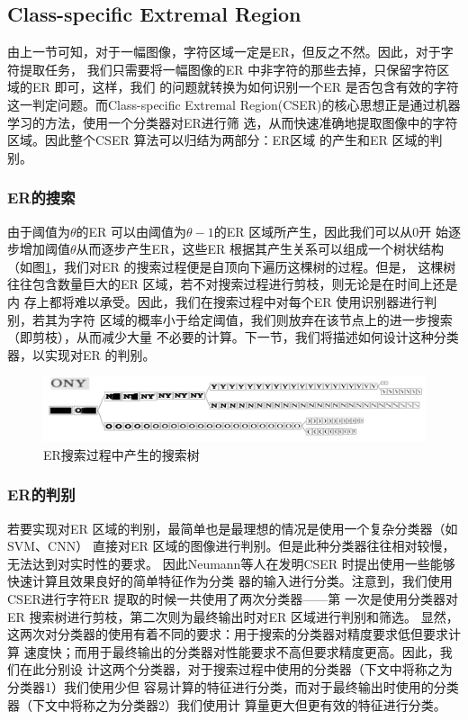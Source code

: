 \subsection{Class-specific Extremal Region}

由上一节可知，对于一幅图像，字符区域一定是ER，但反之不然。因此，对于字符提取任务，
我们只需要将一幅图像的ER 中非字符的那些去掉，只保留字符区域的ER 即可，这样，我们
的问题就转换为如何识别一个ER 是否包含有效的字符这一判定问题。而Class-specific
Extremal Region(CSER)\cite{Neumann:2012ik}的核心思想正是通过机器学习的方法，使用一个分类器对ER进行筛
选，从而快速准确地提取图像中的字符区域。因此整个CSER 算法可以归结为两部分：ER区域
的产生和ER 区域的判别。

\subsubsection{ER的搜索}

由于阈值为$\theta$的ER 可以由阈值为$\theta-1$的ER 区域所产生，因此我们可以从0开
始逐步增加阈值$\theta$从而逐步产生ER，这些ER 根据其产生关系可以组成一个树状结构
（如图\ref{Fig:ERTree}，我们对ER 的搜索过程便是自顶向下遍历这棵树的过程。但是，
这棵树往往包含数量巨大的ER 区域，若不对搜索过程进行剪枝，则无论是在时间上还是内
存上都将难以承受。因此，我们在搜索过程中对每个ER 使用识别器进行判别，若其为字符
区域的概率小于给定阈值，我们则放弃在该节点上的进一步搜索（即剪枝），从而减少大量
不必要的计算。下一节，我们将描述如何设计这种分类器，以实现对ER 的判别。

\begin{figure}[ht]
  \centering
  \includegraphics[width=0.8\linewidth]{./Figure/ERTree.png}
  \caption{ER搜索过程中产生的搜索树}\label{Fig:ERTree}
\end{figure}

\subsubsection{ER的判别}

若要实现对ER 区域的判别，最简单也是最理想的情况是使用一个复杂分类器（如SVM、CNN）
直接对ER 区域的图像进行判别。但是此种分类器往往相对较慢，无法达到对实时性的要求。
因此Neumann等人在发明CSER 时提出使用一些能够快速计算且效果良好的简单特征作为分类
器的输入进行分类。注意到，我们使用CSER进行字符ER 提取的时候一共使用了两次分类器——第
一次是使用分类器对ER 搜索树进行剪枝，第二次则为最终输出时对ER 区域进行判别和筛选。
显然，这两次对分类器的使用有着不同的要求：用于搜索的分类器对精度要求低但要求计算
速度快；而用于最终输出的分类器对性能要求不高但要求精度更高。因此，我们在此分别设
计这两个分类器，对于搜索过程中使用的分类器（下文中将称之为分类器1）我们使用少但
容易计算的特征进行分类，而对于最终输出时使用的分类器（下文中将称之为分类器2）我们使用计
算量更大但更有效的特征进行分类。

